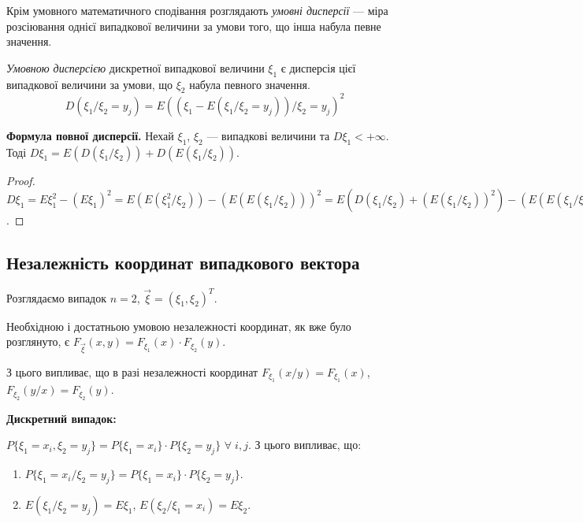 Крім умовного математичного сподівання розглядають
\emph{умовні дисперсії} --- міра розсіювання однієї випадкової величини 
за умови того, що інша набула певне значення.

\begin{definition}
    \emph{Умовною дисперсією} дискретної випадкової величини $\xi_1$ 
    є дисперсія цієї випадкової величини за умови, що 
    $\xi_2$ набула певного значення.
    $$D(\xi_1 / \xi_2 = y_j) = 
    E((\xi_1 - E(\xi_1 / \xi_2 = y_j))/\xi_2 = y_j)^2$$
\end{definition}

\noindent\textbf{Формула повної дисперсії.}
    Нехай $\xi_1$, $\xi_2$ --- випадкові величини та $D\xi_1 < +\infty$. 
    Тоді
    $D\xi_1 = E(D(\xi_1/\xi_2)) + D(E(\xi_1 / \xi_2))$.

\begin{proof}
    $D\xi_1 = E\xi_1^2 - (E \xi_1)^2 = 
    E(E(\xi_1^2 / \xi_2)) - (E(E(\xi_1/\xi_2)))^2 = 
    E(D(\xi_1/\xi_2) + (E(\xi_1/\xi_2))^2) - (E(E(\xi_1/\xi_2)))^2 = 
    E(D(\xi_1 / \xi_2)) + (E(E(\xi_1/\xi_2)^2) - 
    (E(E(\xi_1 / \xi_2)))^2) = E(D(\xi_1/\xi_2)) + D(E(\xi_1/\xi_2))$.
\end{proof}



\subsection{Незалежність координат випадкового вектора}

Розглядаємо випадок $n=2$, $\vec{\xi} = \left(\xi_1, \xi_2\right)^T$.

Необхідною і достатньою умовою незалежності координат, як вже було розглянуто, є 
$F_{\vec{\xi}}(x, y) = F_{\xi_1}(x)\cdot F_{\xi_2}(y)$.

З цього випливає, що в разі незалежності координат $F_{\xi_1}(x/y) = F_{\xi_1}(x)$, 
$F_{\xi_2}(y/x) = F_{\xi_2}(y)$.

\noindent\textbf{Дискретний випадок: }

$P\{\xi_1 = x_i, \xi_2 = y_j\} = P\{\xi_1 = x_i\}\cdot P\{\xi_2 = y_j\}$ 
$\forall \; i,j$.
З цього випливає, що:

\begin{enumerate}
    \item $P\{\xi_1 = x_i / \xi_2 = y_j\} = 
    P\{\xi_1 = x_i\}\cdot P\{\xi_2 = y_j\}$.
    \item $E(\xi_1 / \xi_2 = y_j) = E\xi_1$,
    $E(\xi_2 / \xi_1 = x_i) = E\xi_2$.
\end{enumerate}

